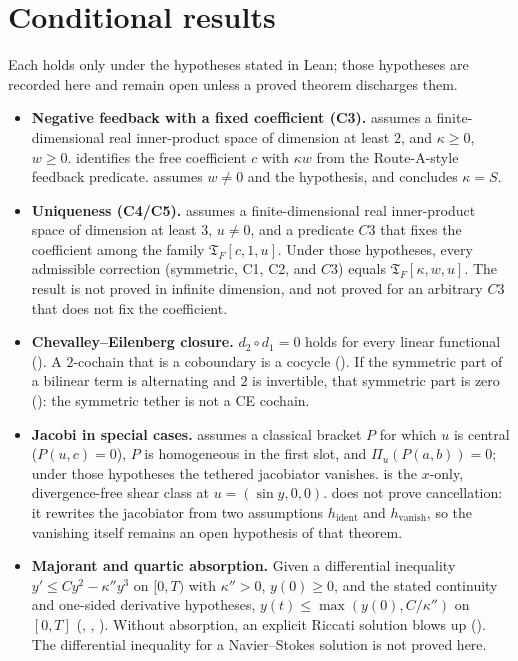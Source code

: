 \documentclass[11pt]{article}
\begin{document}
\section{Conditional results}
Each holds only under the hypotheses stated in Lean; those hypotheses are recorded here and remain open unless a proved theorem discharges them.
\begin{itemize}
\item \textbf{Negative feedback with a fixed coefficient (C3).}  assumes a finite-dimensional real inner-product space of dimension at least $2$, and $\kappa\ge0$, $w\ge0$.  identifies the free coefficient $c$ with $\kappa w$ from the Route-A-style feedback predicate.  assumes $w\neq0$ and the  hypothesis, and concludes $\kappa=S$.
\item \textbf{Uniqueness (C4/C5).}  assumes a finite-dimensional real inner-product space of dimension at least $3$, $u\neq0$, and a predicate $C3$ that fixes the coefficient among the family $\mathfrak{T}_F[c,1,u]$. Under those hypotheses, every admissible correction (symmetric, C1, C2, and $C3$) equals $\mathfrak{T}_F[\kappa,w,u]$. The result is not proved in infinite dimension, and not proved for an arbitrary $C3$ that does not fix the coefficient.
\item \textbf{Chevalley--Eilenberg closure.} $d_2\circ d_1=0$ holds for every linear functional (). A $2$-cochain that is a coboundary is a cocycle (). If the symmetric part of a bilinear term is alternating and $2$ is invertible, that symmetric part is zero (): the symmetric tether is not a CE cochain.
\item \textbf{Jacobi in special cases.}  assumes a classical bracket $P$ for which $u$ is central ($P(u,c)=0$), $P$ is homogeneous in the first slot, and $\Pi_u(P(a,b))=0$; under those hypotheses the tethered jacobiator vanishes.  is the $x$-only, divergence-free shear class at $u=(\sin y,0,0)$.  does not prove cancellation: it rewrites the jacobiator from two assumptions $h_{\mathrm{ident}}$ and $h_{\mathrm{vanish}}$, so the vanishing itself remains an open hypothesis of that theorem.
\item \textbf{Majorant and quartic absorption.} Given a differential inequality $y'\le C y^2-\kappa'' y^3$ on $[0,T)$ with $\kappa''>0$, $y(0)\ge0$, and the stated continuity and one-sided derivative hypotheses, $y(t)\le\max(y(0),C/\kappa'')$ on $[0,T]$ (, , ). Without absorption, an explicit Riccati solution blows up (). The differential inequality for a Navier--Stokes solution is not proved here.

\end{itemize}
\end{document}
